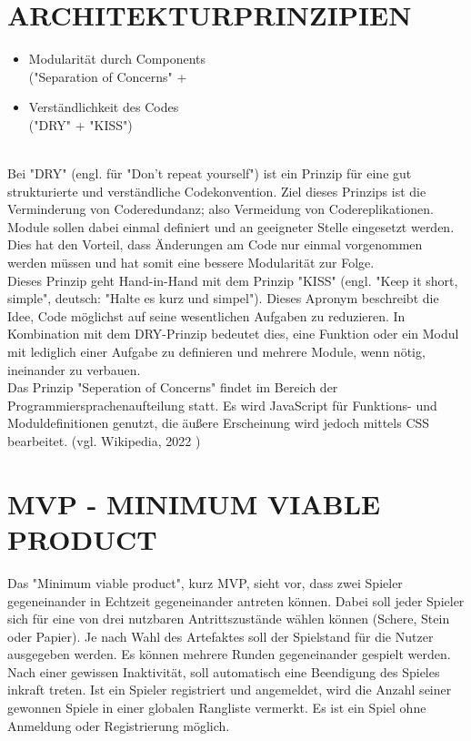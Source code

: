 \documentclass[conference]{IEEEtran}
\begin{document}
\begin{itemize}
\section{ARCHITEKTURPRINZIPIEN}
\begin{itemize}
    \item Modularität durch Components \\
    ("Separation of Concerns" +  \\
    \item Verständlichkeit des Codes \\
    ("DRY" + "KISS")
\end{itemize}
    \\Bei "DRY" (engl. für "Don't repeat yourself") ist ein Prinzip für eine gut strukturierte und verständliche Codekonvention. Ziel dieses Prinzips ist die Verminderung von Coderedundanz; also Vermeidung von Codereplikationen. Module sollen dabei einmal definiert und an geeigneter Stelle eingesetzt werden. Dies hat den Vorteil, dass Änderungen am Code nur einmal vorgenommen werden müssen und hat somit eine bessere Modularität zur Folge.
    \\Dieses Prinzip geht Hand-in-Hand mit dem Prinzip "KISS" (engl. "Keep it short, simple", deutsch: "Halte es kurz und simpel"). Dieses Apronym beschreibt die Idee, Code möglichst auf seine wesentlichen Aufgaben zu reduzieren. In Kombination mit dem DRY-Prinzip bedeutet dies, eine Funktion oder ein Modul mit lediglich einer Aufgabe zu definieren und mehrere Module, wenn nötig, ineinander zu verbauen.
    \\
    Das Prinzip "Seperation of Concerns" findet im Bereich der Programmiersprachenaufteilung statt. Es wird JavaScript für Funktions- und Moduldefinitionen genutzt, die äußere Erscheinung wird jedoch mittels CSS bearbeitet. (vgl. Wikipedia, 2022 \cite{c8})


\section{MVP - MINIMUM VIABLE PRODUCT}
Das "Minimum viable product", kurz MVP, sieht vor, dass zwei Spieler gegeneinander in Echtzeit gegeneinander antreten können. Dabei soll jeder Spieler sich für eine von drei nutzbaren Antrittszustände wählen können (Schere, Stein oder Papier). Je nach Wahl des Artefaktes soll der Spielstand für die Nutzer ausgegeben werden. Es können mehrere Runden gegeneinander gespielt werden.
Nach einer gewissen Inaktivität, soll automatisch eine Beendigung des Spieles inkraft treten.
Ist ein Spieler registriert und angemeldet, wird die Anzahl seiner gewonnen Spiele in einer globalen Rangliste vermerkt. Es ist ein Spiel ohne Anmeldung oder Registrierung möglich.


\end{itemize}
\end{document}
